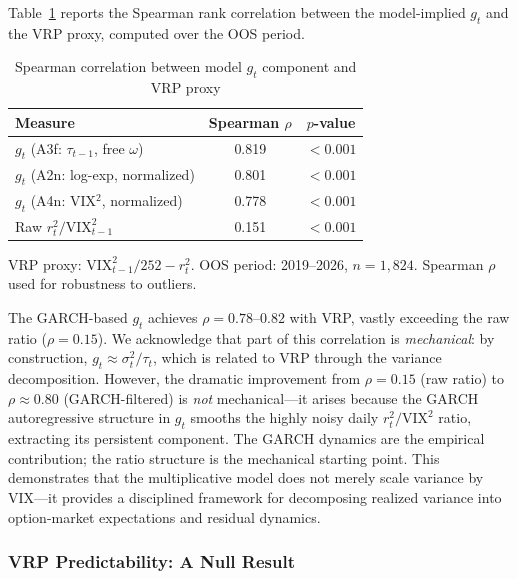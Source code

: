\documentclass[12pt,a4paper]{article}
\begin{document}
Table~\ref{tab:vrp_corr} reports the Spearman rank correlation between the model-implied $g_t$ and the VRP proxy, computed over the OOS period.

\begin{table}[H]
\centering
\caption{Spearman correlation between model $g_t$ component and VRP proxy}
\label{tab:vrp_corr}
\begin{threeparttable}
\begin{tabular}{@{}lcc@{}}
\toprule
Measure & Spearman $\rho$ & $p$-value \\
\midrule
$g_t$ (A3f: $\tau_{t-1}$, free $\omega$) & 0.819 & $< 0.001$ \\
$g_t$ (A2n: log-exp, normalized) & 0.801 & $< 0.001$ \\
$g_t$ (A4n: VIX$^2$, normalized) & 0.778 & $< 0.001$ \\
Raw $r_t^2 / \mathrm{VIX}_{t-1}^2$ & 0.151 & $< 0.001$ \\
\bottomrule
\end{tabular}
\begin{tablenotes}
\footnotesize
\item VRP proxy: $\mathrm{VIX}_{t-1}^2/252 - r_t^2$. OOS period: 2019--2026, $n = 1{,}824$. Spearman $\rho$ used for robustness to outliers.
\end{tablenotes}
\end{threeparttable}
\end{table}

The GARCH-based $g_t$ achieves $\rho = 0.78$--$0.82$ with VRP, vastly exceeding the raw ratio ($\rho = 0.15$). We acknowledge that part of this correlation is \emph{mechanical}: by construction, $g_t \approx \sigma_t^2 / \tau_t$, which is related to VRP through the variance decomposition. However, the dramatic improvement from $\rho = 0.15$ (raw ratio) to $\rho \approx 0.80$ (GARCH-filtered) is \emph{not} mechanical---it arises because the GARCH autoregressive structure in $g_t$ smooths the highly noisy daily $r_t^2/\mathrm{VIX}^2$ ratio, extracting its persistent component. The GARCH dynamics are the empirical contribution; the ratio structure is the mechanical starting point. This demonstrates that the multiplicative model does not merely scale variance by VIX---it provides a disciplined framework for decomposing realized variance into option-market expectations and residual dynamics.

\subsubsection{VRP Predictability: A Null Result}
\end{document}
